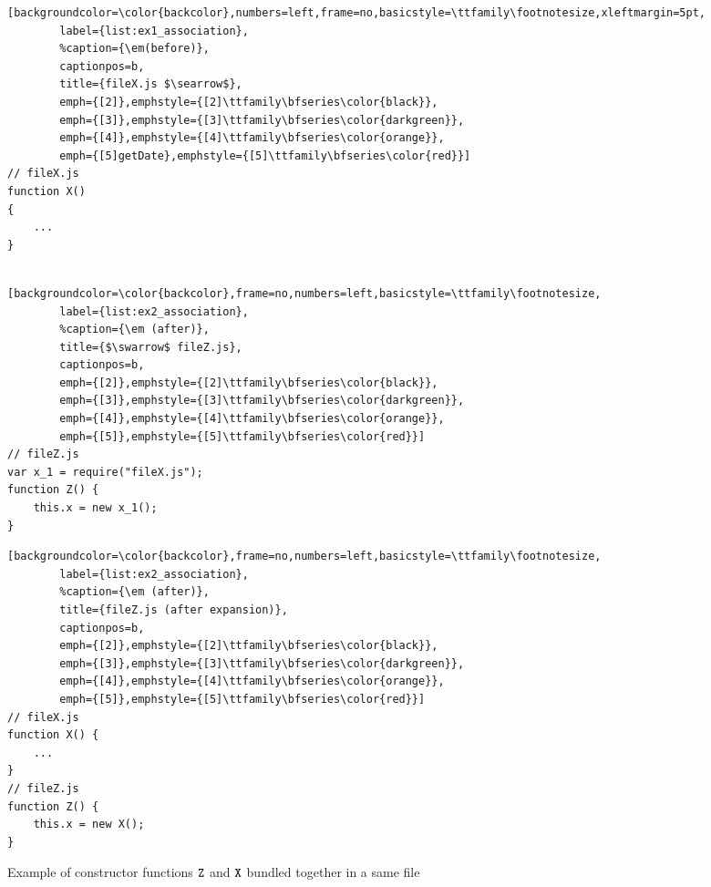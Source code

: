 \documentclass[review]{elsarticle}
\newcommand{\mcode}[1]{$\tt #1$}
\begin{document}
\begin{figure}[ht]
	\centering
	\begin{minipage}{.25\textwidth}
		\begin{lstlisting}[backgroundcolor=\color{backcolor},numbers=left,frame=no,basicstyle=\ttfamily\footnotesize,xleftmargin=5pt,
		label={list:ex1_association},
		%caption={\em(before)},
		captionpos=b,
		title={fileX.js $\searrow$},
		emph={[2]},emphstyle={[2]\ttfamily\bfseries\color{black}},
		emph={[3]},emphstyle={[3]\ttfamily\bfseries\color{darkgreen}},
		emph={[4]},emphstyle={[4]\ttfamily\bfseries\color{orange}},
		emph={[5]getDate},emphstyle={[5]\ttfamily\bfseries\color{red}}]
// fileX.js
function X() 
{
	...
}
		
		\end{lstlisting}
	\end{minipage}
	\hspace{1pt}
	\begin{minipage}{.50\textwidth}
		\begin{lstlisting}[backgroundcolor=\color{backcolor},frame=no,numbers=left,basicstyle=\ttfamily\footnotesize,
		label={list:ex2_association},
		%caption={\em (after)},
		title={$\swarrow$ fileZ.js},
		captionpos=b,
		emph={[2]},emphstyle={[2]\ttfamily\bfseries\color{black}},
		emph={[3]},emphstyle={[3]\ttfamily\bfseries\color{darkgreen}},
		emph={[4]},emphstyle={[4]\ttfamily\bfseries\color{orange}},
		emph={[5]},emphstyle={[5]\ttfamily\bfseries\color{red}}]
// fileZ.js
var x_1 = require("fileX.js");
function Z() {
	this.x = new x_1();
}
		\end{lstlisting}
	\end{minipage}
	
	\hspace{1pt}
	\begin{minipage}{.35\textwidth}
		\begin{lstlisting}[backgroundcolor=\color{backcolor},frame=no,numbers=left,basicstyle=\ttfamily\footnotesize,
		label={list:ex2_association},
		%caption={\em (after)},
		title={fileZ.js (after expansion)},
		captionpos=b,
		emph={[2]},emphstyle={[2]\ttfamily\bfseries\color{black}},
		emph={[3]},emphstyle={[3]\ttfamily\bfseries\color{darkgreen}},
		emph={[4]},emphstyle={[4]\ttfamily\bfseries\color{orange}},
		emph={[5]},emphstyle={[5]\ttfamily\bfseries\color{red}}]
// fileX.js
function X() {
	...
}
// fileZ.js
function Z() {
	this.x = new X();
}
		\end{lstlisting}
	\end{minipage}
	\hspace{26pt}
	
	\caption{Example of constructor functions \mcode{Z} and \mcode{X} bundled together in a same file}
	\label{fig:example-rq2}
\end{figure}
\end{document}
